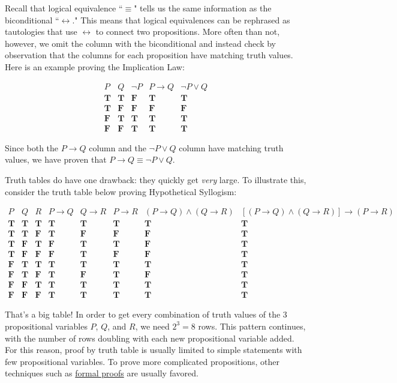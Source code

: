 \documentclass[11pt,oneside]{book}
\theoremstyle{definition}
\newcommand{\T}{\mathbf{T}}
\newcommand{\F}{\mathbf{F}}
\begin{document}
Recall that logical equivalence ``$\equiv$" tells us the same information as the biconditional ``$\leftrightarrow$."
This means that logical equivalences can be rephrased as tautologies that use $\leftrightarrow$ to connect two propositions.
More often than not, however, we omit the column with the biconditional and instead check by observation that the columns for each proposition have matching truth values.
Here is an example proving the Implication Law:

\[\begin{array}{c|c|c|c|c}
P & Q & \lnot P & P \rightarrow Q & \lnot P \lor Q \\
\hline
\T & \T & \F & \T & \T \\
\T & \F & \F & \F & \F \\
\F & \T & \T & \T & \T \\
\F & \F & \T & \T & \T
\end{array}\]

Since both the $P \rightarrow Q$ column and the $\lnot P \lor Q$ column have matching truth values, we have proven that $P \rightarrow Q \equiv \lnot P \lor Q$.

Truth tables do have one drawback: they quickly get \emph{very} large.
To illustrate this, consider the truth table below proving Hypothetical Syllogism:

\[\begin{array}{c|c|c|c|c|c|c|c}
P & Q & R & P \rightarrow Q & Q \rightarrow R & P \rightarrow R & (P \rightarrow Q) \land (Q \rightarrow R) & [(P \rightarrow Q) \land (Q \rightarrow R)] \rightarrow (P \rightarrow R) \\
\hline
\T & \T & \T & \T & \T & \T & \T & \T \\
\T & \T & \F & \T & \F & \F & \F & \T \\
\T & \F & \T & \F & \T & \T & \F & \T \\
\T & \F & \F & \F & \T & \F & \F & \T \\
\F & \T & \T & \T & \T & \T & \T & \T \\
\F & \T & \F & \T & \F & \T & \F & \T \\
\F & \F & \T & \T & \T & \T & \T & \T \\
\F & \F & \F & \T & \T & \T & \T & \T
\end{array}\]

That's a big table!
In order to get every combination of truth values of the 3 propositional variables $P$, $Q$, and $R$, we need $2^{3} = 8$ rows.
This pattern continues, with the number of rows doubling with each new propositional variable added.
For this reason, proof by truth table is usually limited to simple statements with few propositional variables.
To prove more complicated propositions, other techniques such as \hyperref[sec:FormalProofs]{formal proofs} are usually favored.
\end{document}
